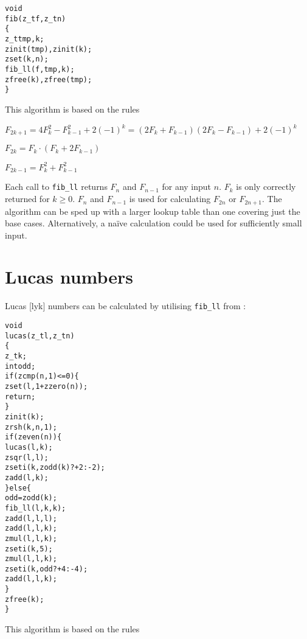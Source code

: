 \newpage
\begin{alltt}
   void
   fib(z_t f, z_t n)
   \{
       z_t tmp, k;
       zinit(tmp), zinit(k);
       zset(k, n);
       fib_ll(f, tmp, k);
       zfree(k), zfree(tmp);
   \}
\end{alltt}

\noindent
This algorithm is based on the rules

\vspace{1em}
\( \displaystyle{
    F_{2k + 1} = 4F_k^2 - F_{k - 1}^2 + 2(-1)^k = (2F_k + F_{k-1})(2F_k - F_{k-1}) + 2(-1)^k
}\)
\vspace{1em}

\( \displaystyle{
    F_{2k} = F_k \cdot (F_k + 2F_{k - 1})
}\)
\vspace{1em}

\( \displaystyle{
    F_{2k - 1} = F_k^2 + F_{k - 1}^2
}\)
\vspace{1em}

\noindent
Each call to {\tt fib\_ll} returns $F_n$ and $F_{n - 1}$
for any input $n$. $F_{k}$ is only correctly returned
for $k \ge 0$. $F_n$ and $F_{n - 1}$ is used for
calculating $F_{2n}$ or $F_{2n + 1}$. The algorithm
can be sped up with a larger lookup table than one
covering just the base cases. Alternatively, a naïve
calculation could be used for sufficiently small input.


\newpage
\section{Lucas numbers}
\label{sec:Lucas numbers}

Lucas [lyk\textscripta] numbers can be calculated by utilising
{\tt fib\_ll} from :

\begin{alltt}
   void
   lucas(z_t l, z_t n)
   \{
       z_t k;
       int odd;
       if (zcmp(n, 1) <= 0) \{
           zset(l, 1 + zzero(n));
           return;
       \}
       zinit(k);
       zrsh(k, n, 1);
       if (zeven(n)) \{
           lucas(l, k);
           zsqr(l, l);
           zseti(k, zodd(k) ? +2 : -2);
           zadd(l, k);
       \} else \{
           odd = zodd(k);
           fib_ll(l, k, k);
           zadd(l, l, l);
           zadd(l, l, k);
           zmul(l, l, k);
           zseti(k, 5);
           zmul(l, l, k);
           zseti(k, odd ? +4 : -4);
           zadd(l, l, k);
       \}
       zfree(k);
   \}
\end{alltt}

\noindent
This algorithm is based on the rules

